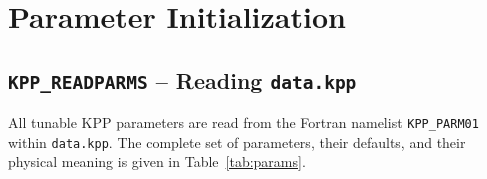 \documentclass[12pt,letterpaper]{article}
\begin{document}
\section{Parameter Initialization}  
  
\subsection{\texttt{KPP\_READPARMS} -- Reading \texttt{data.kpp}}  
  
All tunable KPP parameters are read from the Fortran namelist  
\texttt{KPP\_PARM01} within \texttt{data.kpp}. The complete set of  
parameters, their defaults, and their physical meaning is given in  
Table~\ref{tab:params}.  
  
\end{document}

